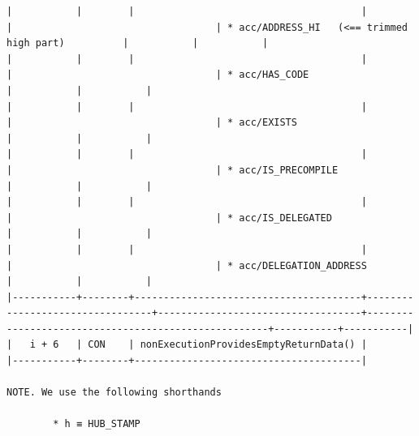 \documentclass[varwidth=\maxdimen,margin=0.5cm,multi={verbatim}]{standalone}
\begin{document}
\begin{verbatim}
|           |        |                                       |                                 |                                   | * acc/ADDRESS_HI   (<== trimmed high part)          |           |           |
|           |        |                                       |                                 |                                   | * acc/HAS_CODE                                      |           |           |
|           |        |                                       |                                 |                                   | * acc/EXISTS                                        |           |           |
|           |        |                                       |                                 |                                   | * acc/IS_PRECOMPILE                                 |           |           |
|           |        |                                       |                                 |                                   | * acc/IS_DELEGATED                                  |           |           |
|           |        |                                       |                                 |                                   | * acc/DELEGATION_ADDRESS                            |           |           |
|-----------+--------+---------------------------------------+---------------------------------+-----------------------------------+-----------------------------------------------------+-----------+-----------|
|   i + 6   | CON    | nonExecutionProvidesEmptyReturnData() |
|-----------+--------+---------------------------------------|

NOTE. We use the following shorthands

        * h ≡ HUB_STAMP

\end{verbatim}
\end{document}
